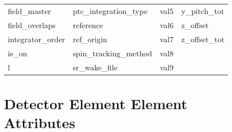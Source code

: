 \begin{tabular}{llll}
field_master                & ptc_integration_type        & val5                        & y_pitch_tot                 \\
field_overlaps              & reference                   & val6                        & z_offset                    \\
integrator_order            & ref_origin                  & val7                        & z_offset_tot                \\
is_on                       & spin_tracking_method        & val8                        &                             \\
l                           & sr_wake_file                & val9                        &                             \\
 \bottomrule
 \end{tabular}
 \vfill
 
 \section{Detector Element Element Attributes}
 \label{s:list.detector}
 
